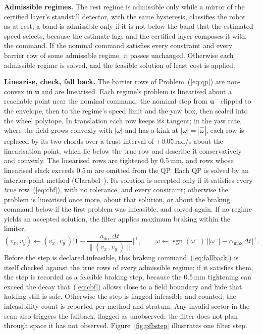 \documentclass[sensors,article,submit,moreauthors]{Definitions/mdpi}
\begin{document}
\textbf{Admissible regimes.} The rest regime is admissible only while a mirror of the certified layer's standstill detector, with the same hysteresis, classifies the robot as at rest; a band is admissible only if it is not below the band that the estimated speed selects, because the estimate lags and the certified layer composes it with the command. If the nominal command satisfies every constraint and every barrier row of some admissible regime, it passes unchanged. Otherwise each admissible regime is solved, and the feasible solution of least cost is applied.

\textbf{Linearise, check, fall back.} The barrier rows of Problem~(\ref{eq:qp}) are non-convex in $\mathbf{u}$ and are linearised. Each regime's problem is linearised about a reachable point near the nominal command: the nominal step from $\mathbf{u}^-$ clipped to the envelope, then to the regime's speed limit and the yaw box, then scaled into the wheel polytope. In translation each row keeps its tangent; in the yaw rate, where the field grows convexly with $|\omega|$ and has a kink at $|\omega| = |\hat\omega|$, each row is replaced by its two chords over a trust interval of $\pm 0.05$\,rad/s about the linearisation point, which lie below the true row and describe it conservatively and convexly. The linearised rows are tightened by 0.5\,mm, and rows whose linearised slack exceeds 0.5\,m are omitted from the QP\@. Each QP is solved by an interior-point method (Clarabel~\citep{goulart2024clarabel}). Its solution is accepted only if it satisfies every \emph{true} row~(\ref{eq:cbf}), with no tolerance, and every constraint; otherwise the problem is linearised once more, about that solution, or about the braking command below if the first problem was infeasible, and solved again. If no regime yields an accepted solution, the filter applies maximum braking within the limiter,
\begin{equation}
(v_x, v_y) \leftarrow (v^-_x, v^-_y)\Big[1 - \frac{a_{\text{dec}}\Delta t}{\|(v^-_x, v^-_y)\|}\Big]^+,\qquad
\omega \leftarrow \operatorname{sgn}(\omega^-)\,\big[|\omega^-| - \alpha_{\max}\Delta t\big]^+.
\label{eq:fallback}
\end{equation}
Before the step is declared infeasible, this braking command~(\ref{eq:fallback}) is itself checked against the true rows of every admissible regime; if it satisfies them, the step is recorded as a feasible braking step, because the 0.5\,mm tightening can exceed the decay that~(\ref{eq:cbf}) allows close to a field boundary and hide that holding still is safe. Otherwise the step is flagged infeasible and counted; the infeasibility count is reported per method and stratum. Any invalid sector in the scan also triggers the fallback, flagged as unobserved: the filter does not plan through space it has not observed. Figure~\ref{fig:pfbstep} illustrates one filter step.
\end{document}
